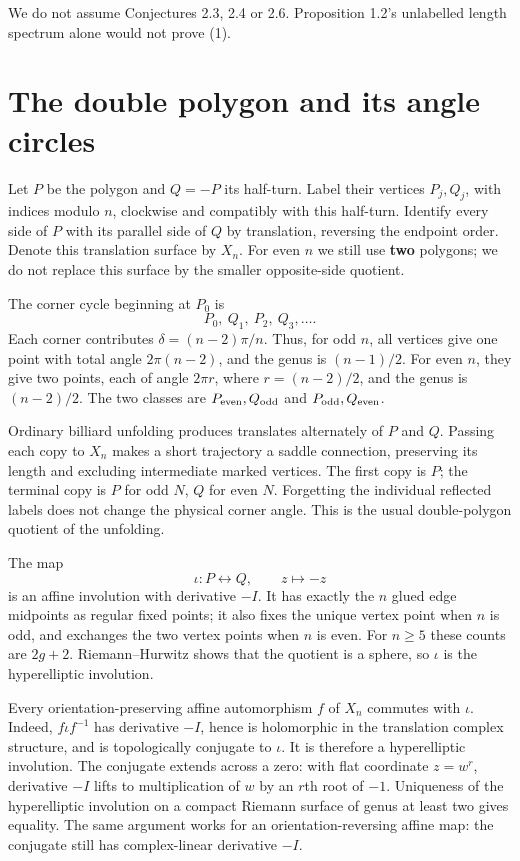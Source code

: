 \documentclass[11pt]{article}
\begin{document}
We do not assume Conjectures 2.3, 2.4 or 2.6. Proposition 1.2's unlabelled length spectrum alone would not prove (1).

\section{The double polygon and its angle circles}

Let \(P\) be the polygon and \(Q=-P\) its half-turn. Label their vertices \(P_j,Q_j\), with indices modulo \(n\), clockwise and compatibly with this half-turn. Identify every side of \(P\) with its parallel side of \(Q\) by translation, reversing the endpoint order. Denote this translation surface by \(X_n\). For even \(n\) we still use \textbf{two} polygons; we do not replace this surface by the smaller opposite-side quotient.

The corner cycle beginning at \(P_0\) is
\[
P_0,\ Q_1,\ P_2,\ Q_3,\ldots .
\tag{3}
\]
Each corner contributes \(\delta=(n-2)\pi/n\). Thus, for odd \(n\), all vertices give one point with total angle \(2\pi(n-2)\), and the genus is \((n-1)/2\). For even \(n\), they give two points, each of angle \(2\pi r\), where \(r=(n-2)/2\), and the genus is \((n-2)/2\). The two classes are \(P_{\rm even},Q_{\rm odd}\) and \(P_{\rm odd},Q_{\rm even}\).

Ordinary billiard unfolding produces translates alternately of \(P\) and \(Q\). Passing each copy to \(X_n\) makes a short trajectory a saddle connection, preserving its length and excluding intermediate marked vertices. The first copy is \(P\); the terminal copy is \(P\) for odd \(N\), \(Q\) for even \(N\). Forgetting the individual reflected labels does not change the physical corner angle. This is the usual double-polygon quotient of the unfolding.

The map
\[
\iota:P\longleftrightarrow Q,\qquad z\longmapsto-z
\tag{4}
\]
is an affine involution with derivative \(-I\). It has exactly the \(n\) glued edge midpoints as regular fixed points; it also fixes the unique vertex point when \(n\) is odd, and exchanges the two vertex points when \(n\) is even. For \(n\ge5\) these counts are \(2g+2\). Riemann--Hurwitz shows that the quotient is a sphere, so \(\iota\) is the hyperelliptic involution.

Every orientation-preserving affine automorphism \(f\) of \(X_n\) commutes with \(\iota\). Indeed, \(f\iota f^{-1}\) has derivative \(-I\), hence is holomorphic in the translation complex structure, and is topologically conjugate to \(\iota\). It is therefore a hyperelliptic involution. The conjugate extends across a zero: with flat coordinate \(z=w^r\), derivative \(-I\) lifts to multiplication of \(w\) by an \(r\)th root of \(-1\). Uniqueness of the hyperelliptic involution on a compact Riemann surface of genus at least two gives equality. The same argument works for an orientation-reversing affine map: the conjugate still has complex-linear derivative \(-I\).
\end{document}
